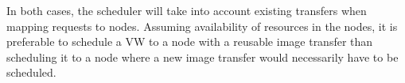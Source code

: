 In both cases, the scheduler will take into account existing transfers when mapping requests to nodes. Assuming availability of resources in the nodes, it is preferable to schedule a VW to a node with a reusable image transfer than scheduling it to a node where a new image transfer would necessarily have to be scheduled.





